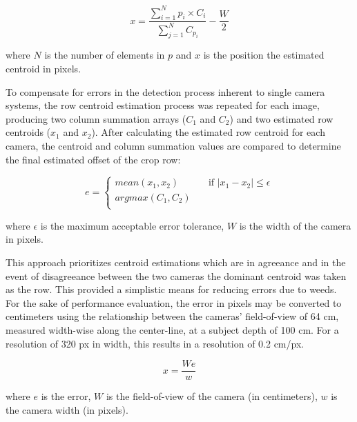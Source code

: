 \documentclass[authoryear]{elsarticle}
\begin{document}
\begin{equation}
    x = \frac{\displaystyle\sum_{i=1}^{N} p_{i} \times
      C_{i}}{\displaystyle\sum_{j=1}^{N} C_{p_{i}}} - \frac{W}{2}
  \label{eq:centroid}
\end{equation}
\begin{flushleft}
where $N$ is the number of elements in $p$ and $x$ is the position the
estimated centroid in pixels.
\end{flushleft}

To compensate for errors in the detection process inherent to single
camera systems, the row centroid estimation process was repeated for
each image, producing two column summation arrays ($C_{1}$ and $C_{2}$) and two
estimated row centroids ($x_{1}$ and $x_{2}$). After calculating the estimated
row centroid for each camera, the centroid and column summation values
are compared to determine the final estimated offset of the crop row:

\begin{equation}
  e = 
  \begin{cases}
    mean(x_{1},x_{2})  & \quad \text{if } |x_{1}-x_{2}| \leq  \epsilon\\
    argmax(C_{1},C_{2})  & \quad  \\
  \end{cases}
  \label{eq:camera_selection}
\end{equation}
\begin{flushleft}
where $\epsilon$ is the maximum acceptable error tolerance, $W$ is the width of
the camera in pixels. 
\end{flushleft}

This approach prioritizes centroid estimations which are in agreeance
and in the event of disagreeance between the two cameras the dominant
centroid was taken as the row. This provided a simplistic means for
reducing errors due to weeds. For the sake of performance evaluation,
the error in pixels may be converted to centimeters using the
relationship between the cameras’ field-of-view of 64 cm, measured
width-wise along the center-line, at a subject depth of 100 cm. For a
resolution of 320 px in width, this results in a resolution of 0.2 cm/px.

\begin{equation}
  x = \frac{We}{w}
  \label{eq:px2mm}
\end{equation}
\begin{flushleft}
where $e$ is the error, $W$ is the field-of-view of the camera (in
centimeters), $w$ is the camera width (in pixels).
\end{flushleft}
\end{document}
